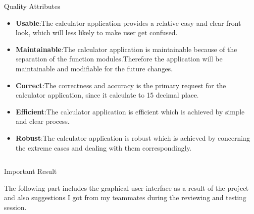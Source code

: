 \documentclass[final]{beamer}
\newlength{\onecolwid}
\newlength{\twocolwid}
\begin{document}
\begin{frame}[t]
\begin{columns}[t]
\begin{column}{\twocolwid}
\begin{columns}[t,totalwidth=\twocolwid]
\begin{column}{\onecolwid}

\begin{block}{Quality Attributes}
\begin{itemize}
\setlength{\itemsep}{20pt}
\item \textbf{Usable}:The calculator application provides a relative easy and clear front look, which will less likely to make user get confused.
\item \textbf{Maintainable}:The calculator application is maintainable because of the separation of  the function modules.Therefore the application will be maintainable and modifiable for the future changes.
\item \textbf{Correct}:The correctness and accuracy is the primary request for the calculator application, since it calculate to 15 decimal place.
\item \textbf{Efficient}:The calculator application is efficient which is achieved by simple and clear process.
\item \textbf{Robust}:The calculator application is robust which is achieved by concerning the extreme cases and dealing with them correspondingly.

\end{itemize}

\end{block}


\end{column} %

\end{columns} %


\begin{alertblock}{Important Result}

The following part includes the graphical user interface as a result of the project and also suggestions I got from my teammates during the reviewing and testing session.
\end{alertblock} 


\end{column}
\end{columns}
\end{frame}
\end{document}
